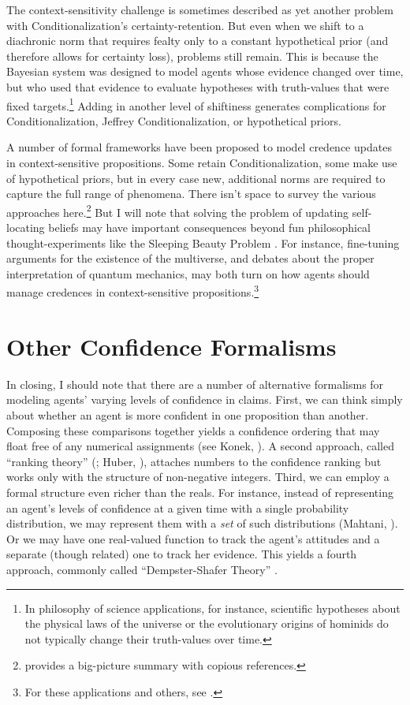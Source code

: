 The context-sensitivity challenge is sometimes described as yet another problem with Conditionalization's certainty-retention. But even when we shift to a diachronic norm that requires fealty only to a constant hypothetical prior (and therefore allows for certainty loss), problems still remain. This is because the Bayesian system was designed to model agents whose evidence changed over time, but who used that evidence to evaluate hypotheses with truth-values that were fixed targets.\footnote
{In philosophy of science applications, for instance, scientific hypotheses about the physical laws of the universe or the evolutionary origins of hominids do not typically change their truth-values over time.}
 Adding in another level of shiftiness generates complications for Conditionalization, Jeffrey Conditionalization, or hypothetical priors.
 
A number of formal frameworks have been proposed to model credence updates in context-sensitive propositions. Some retain Conditionalization, some make use of hypothetical priors, but in every case new, additional norms are required to capture the full range of phenomena. There isn't space to survey the various approaches here.\footnote
{\citet{TitelbaumSelfLocating} provides a big-picture summary with copious references.}
 But I will note that solving the problem of updating self-locating beliefs may have important consequences beyond fun philosophical thought-experiments like the Sleeping Beauty Problem \citep{ElgaBeauty}. For instance, fine-tuning arguments for the existence of the multiverse, and debates about the proper interpretation of quantum mechanics, may both turn on how agents should manage credences in context-sensitive propositions.\footnote
 {For these applications and others, see \citet{TitelbaumTenReasons}.}
 
 
\section{Other Confidence Formalisms} \label{s:extensions}
In closing, I should note that there are a number of alternative formalisms for modeling agents' varying levels of confidence in claims. First, we can think simply about whether an agent is more confident in one proposition than another. Composing these comparisons together yields a confidence ordering that may float free of any numerical assignments (see Konek, ). A second approach, called ``ranking theory'' (\citealp{SpohnLaws}; Huber, ), attaches numbers to the confidence ranking but works only with the structure of non-negative integers. Third, we can employ a formal structure even richer than the reals. For instance, instead of representing an agent's levels of confidence at a given time with a single probability distribution, we may represent them with a \emph{set} of such distributions (Mahtani, ). Or we may have one real-valued function to track the agent's attitudes and a separate (though related) one to track her evidence. This yields a fourth approach, commonly called ``Dempster-Shafer Theory'' \citep{DempsterNewMethods,ShaferMathematicalTheory}.

